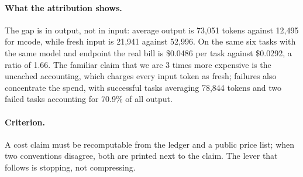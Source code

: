 \paragraph{What the attribution shows.} The gap is in output, not in input:
average output is 73,051 tokens against 12,495 for mcode,
while fresh input is 21,941 against 52,996. On the same six
tasks with the same model and endpoint the real bill is \$0.0486 per
task against \$0.0292, a ratio of 1.66. The familiar claim
that we are 3 times more expensive is the uncached accounting, which
charges every input token as fresh; failures also concentrate the spend, with
successful tasks averaging 78,844 tokens and two failed tasks
accounting for 70.9\% of all output.

\paragraph{Criterion.} A cost claim must be recomputable from the ledger and a
public price list; when two conventions disagree, both are printed next to the
claim. The lever that follows is stopping, not compressing.

